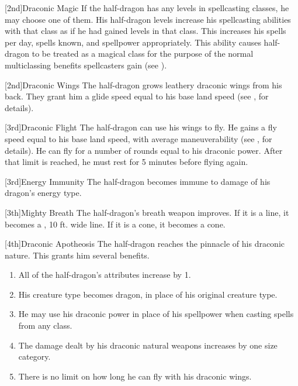             [2nd]{Draconic Magic} If the half-dragon has any levels in spellcasting classes, he may choose one of them.
            His half-dragon levels increase his spellcasting abilities with that class as if he had gained levels in that class.
            This increases his spells per day, spells known, and spellpower appropriately.
            This ability causes half-dragon to be treated as a magical class for the purpose of the normal multiclassing benefits spellcasters gain (see ).

            [2nd]{Draconic Wings}
            The half-dragon grows leathery draconic wings from his back.
            They grant him a glide speed equal to his base land speed (see , for details).

            [3rd]{Draconic Flight}
            The half-dragon can use his wings to fly.
            He gains a fly speed equal to his base land speed, with average maneuverability (see , for details).
            He can fly for a number of rounds equal to his draconic power.
            After that limit is reached, he must rest for 5 minutes before flying again.

            [3rd]{Energy Immunity} The half-dragon becomes immune to damage of his dragon's energy type.

            [3th]{Mighty Breath}
            The half-dragon's breath weapon improves.
            If it is a line, it becomes a \areahuge, 10 ft. wide line.
            If it is a cone, it becomes a \arealarge cone.

            [4th]{Draconic Apotheosis}
            The half-dragon reaches the pinnacle of his draconic nature.
            This grants him several benefits.
            \begin{enumerate}
                \item All of the half-dragon's attributes increase by 1.
                \item His creature type becomes dragon, in place of his original creature type.
                \item He may use his draconic power in place of his spellpower when casting spells from any class.
                \item The damage dealt by his draconic natural weapons increases by one size category.
                \item There is no limit on how long he can fly with his draconic wings.
            \end{enumerate}


